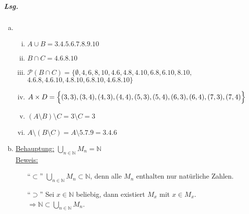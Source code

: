 \documentclass{scrreprt}
\begin{document}
\subparagraph{Lsg.}
\begin{enumerate}[(a)]
\item {}
  \begin{enumerate}[(i)]
  \item $A \cup B = \qty{3, 4, 5, 6, 7, 8, 9, 10}$
  \item $B \cap C = \qty{4, 6, 8, 10}$
  \item $\mathcal{P}(B \cap C) = \Big\{
      \emptyset,
      \qty{4}, \qty{6}, \qty{8}, \qty{10},
      \qty{4, 6}, \qty{4, 8}, \qty{4, 10}, \qty{6, 8}, \qty{6, 10}, \qty{8, 10},$ \\
      $\qty{4, 6, 8}, \qty{4, 6, 10}, \qty{4, 8, 10},\qty{6, 8, 10},
      \qty{4, 6, 8, 10}
    \Big\}$
  \item $A \times D = \qty\Big{
      \qty(3, 3), \qty(3, 4),
      \qty(4, 3), \qty(4, 4),
      \qty(5, 3), \qty(5, 4),
      \qty(6, 3), \qty(6, 4),
      \qty(7, 3), \qty(7, 4)
    }$
  \item $(A \setminus B) \setminus C = \qty{3} \setminus C = \qty{3}$
  \item $A \setminus (B \setminus C) = A \setminus \qty{5, 7, 9} = \qty{3, 4, 6}$
  \end{enumerate}

\item \underline{Behauptung:} $\underset{n \in \mathbb{N}}\bigcup M_n
  = \mathbb{N}$ \\
  \underline{Beweis:}
  \begin{itemize}
  \item[``$\subset$'']
    $\underset{n \in \mathbb{N}}\bigcup M_n \subset \mathbb{N}$,
    denn alle $M_n$ enthalten nur natürliche Zahlen.

  \item[``$\supset$'']
    Sei $x \in \mathbb{N}$ beliebig, dann existiert $M_x$ mit $x \in M_x$.
    $\Rightarrow \mathbb{N} \subset \underset{n \in \mathbb{N}}\bigcup M_n$.
  \end{itemize}


\end{enumerate}
\end{document}
